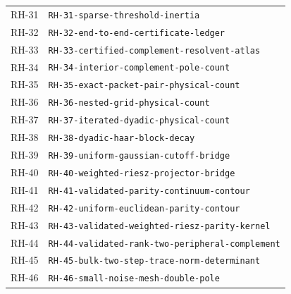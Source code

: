 \begin{longtable}{r >{\raggedright\arraybackslash}p{}}
RH-31 & \texttt{RH-\allowbreak{}31-\allowbreak{}sparse-\allowbreak{}threshold-\allowbreak{}inertia}\\
RH-32 & \texttt{RH-\allowbreak{}32-\allowbreak{}end-\allowbreak{}to-\allowbreak{}end-\allowbreak{}certificate-\allowbreak{}ledger}\\
RH-33 & \texttt{RH-\allowbreak{}33-\allowbreak{}certified-\allowbreak{}complement-\allowbreak{}resolvent-\allowbreak{}atlas}\\
RH-34 & \texttt{RH-\allowbreak{}34-\allowbreak{}interior-\allowbreak{}complement-\allowbreak{}pole-\allowbreak{}count}\\
RH-35 & \texttt{RH-\allowbreak{}35-\allowbreak{}exact-\allowbreak{}packet-\allowbreak{}pair-\allowbreak{}physical-\allowbreak{}count}\\
RH-36 & \texttt{RH-\allowbreak{}36-\allowbreak{}nested-\allowbreak{}grid-\allowbreak{}physical-\allowbreak{}count}\\
RH-37 & \texttt{RH-\allowbreak{}37-\allowbreak{}iterated-\allowbreak{}dyadic-\allowbreak{}physical-\allowbreak{}count}\\
RH-38 & \texttt{RH-\allowbreak{}38-\allowbreak{}dyadic-\allowbreak{}haar-\allowbreak{}block-\allowbreak{}decay}\\
RH-39 & \texttt{RH-\allowbreak{}39-\allowbreak{}uniform-\allowbreak{}gaussian-\allowbreak{}cutoff-\allowbreak{}bridge}\\
RH-40 & \texttt{RH-\allowbreak{}40-\allowbreak{}weighted-\allowbreak{}riesz-\allowbreak{}projector-\allowbreak{}bridge}\\
RH-41 & \texttt{RH-\allowbreak{}41-\allowbreak{}validated-\allowbreak{}parity-\allowbreak{}continuum-\allowbreak{}contour}\\
RH-42 & \texttt{RH-\allowbreak{}42-\allowbreak{}uniform-\allowbreak{}euclidean-\allowbreak{}parity-\allowbreak{}contour}\\
RH-43 & \texttt{RH-\allowbreak{}43-\allowbreak{}validated-\allowbreak{}weighted-\allowbreak{}riesz-\allowbreak{}parity-\allowbreak{}kernel}\\
RH-44 & \texttt{RH-\allowbreak{}44-\allowbreak{}validated-\allowbreak{}rank-\allowbreak{}two-\allowbreak{}peripheral-\allowbreak{}complement}\\
RH-45 & \texttt{RH-\allowbreak{}45-\allowbreak{}bulk-\allowbreak{}two-\allowbreak{}step-\allowbreak{}trace-\allowbreak{}norm-\allowbreak{}determinant}\\
RH-46 & \texttt{RH-\allowbreak{}46-\allowbreak{}small-\allowbreak{}noise-\allowbreak{}mesh-\allowbreak{}double-\allowbreak{}pole}\\

\end{longtable}
